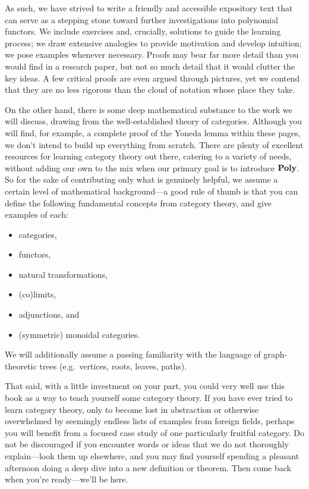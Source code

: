 \documentclass[Book-Poly]{subfiles}
\begin{document}
As such, we have strived to write a friendly and accessible expository text that can serve as a stepping stone toward further investigations into polynomial functors.
We include exercises and, crucially, solutions to guide the learning process; we draw extensive analogies to provide motivation and develop intuition; we pose examples whenever necessary.
Proofs may bear far more detail than you would find in a research paper, but not so much detail that it would clutter the key ideas.
A few critical proofs are even argued through pictures, yet we contend that they are no less rigorous than the cloud of notation whose place they take.

On the other hand, there is some deep mathematical substance to the work we will discuss, drawing from the well-established theory of categories.
Although you will find, for example, a complete proof of the Yoneda lemma within these pages, we don't intend to build up everything from scratch.
There are plenty of excellent resources for learning category theory out there, catering to a variety of needs, without adding our own to the mix when our primary goal is to introduce $\mathbf{Poly}$.
So for the sake of contributing only what is genuinely helpful, we assume a certain level of mathematical background---a good rule of thumb is that you can define the following fundamental concepts from category theory, and give examples of each:
\begin{itemize}
    \item categories,
    \item functors,
    \item natural transformations,
    \item (co)limits,
    \item adjunctions, and
    \item (symmetric) monoidal categories.
\end{itemize}
We will additionally assume a passing familiarity with the language of graph-theoretic trees (e.g.\ vertices, roots, leaves, paths).

That said, with a little investment on your part, you could very well use this book as a way to teach yourself some category theory.
If you have ever tried to learn category theory, only to become lost in abstraction or otherwise overwhelmed by seemingly endless lists of examples from foreign fields, perhaps you will benefit from a focused case study of one particularly fruitful category.
Do not be discouraged if you encounter words or ideas that we do not thoroughly explain---look them up elsewhere, and you may find yourself spending a pleasant afternoon doing a deep dive into a new definition or theorem.
Then come back when you're ready---we'll be here.
\end{document}
